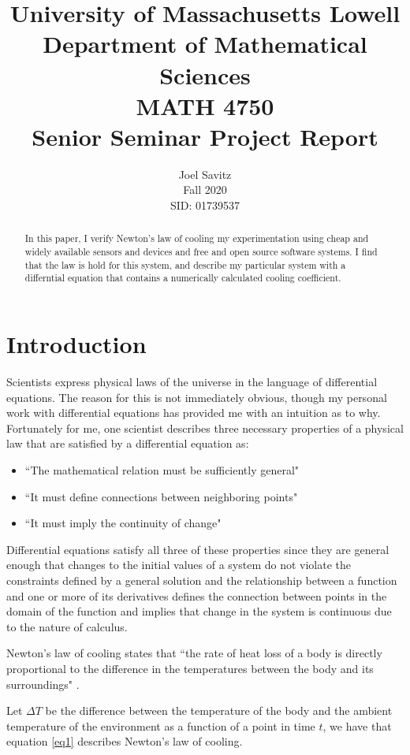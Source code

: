 \documentclass[12pt]{article}
\title{ University of Massachusetts Lowell \protect\\
	Department of Mathematical Sciences\protect\\
MATH 4750 \protect\\
Senior Seminar Project Report}
\author{Joel Savitz \\ Fall 2020 \\ SID: 01739537}
\begin{document}
\maketitle

\begin{abstract}
	In this paper,
	I verify Newton's law of cooling my experimentation
	using cheap and widely available sensors and devices
	and free and open source software systems.
	I find that the law is hold for this system,
	and describe my particular system
	with a differntial equation
	that contains a numerically calculated cooling coefficient.
\end{abstract}

\section{Introduction}

Scientists express physical laws of
the universe in the language of differential equations.
The reason for this is not immediately obvious,
though my personal work with differential equations
has provided me with an intuition as to why.
Fortunately for me,
one scientist describes three necessary properties
of a physical law that are satisfied by a differential equation as: 


\begin{itemize}
	\item ``The mathematical relation must be sufficiently general"
	\item ``It must define connections between neighboring points"
	\item ``It must imply the continuity of change"\citep{whydiffeq}
\end{itemize}

Differential equations satisfy all three of these properties
since they are general enough that
changes to the initial values of a system
do not violate the constraints defined by a general solution
and the relationship between a function and one or more of its derivatives
defines the connection between points in the domain of the function
and implies that change in the system is continuous
due to the nature of calculus.


Newton's law of cooling states that
``the rate of heat loss of a body is
directly proportional to the difference
in the temperatures between the body and
its surroundings" \citep{wiki}.

Let $\Delta T$ be the difference between
the temperature of the body
and the ambient temperature of the environment
as a function of a point in time $t$,
we have that equation \ref{eq1}
describes Newton's law of cooling.
\end{document}
